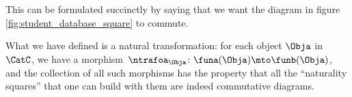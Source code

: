 %
\begin{marginfigure}
    \centering
    \caption{}
    \label{fig:student_database_square}
\end{marginfigure}
%

This can be formulated succinctly by saying that we want the diagram in figure \cref{fig:student_database_square} to commute.

What we have defined is a natural transformation: for each object $\Obja$ in~$\CatC$, we have a morphism~$\ntrafoa_\Obja \colon \funa(\Obja) \mto \funb(\Obja)$, and the collection of all such morphisms has the property that all the ``naturality squares'' that one can build with them are indeed commutative diagrams.

